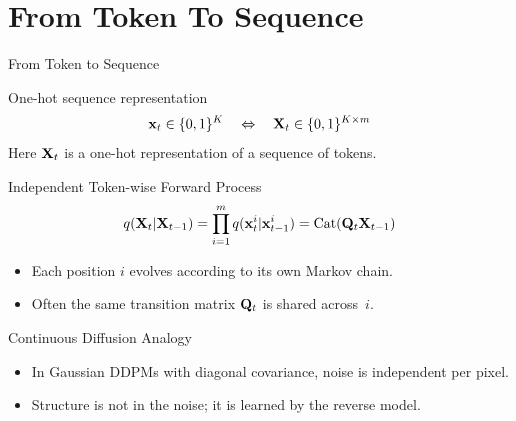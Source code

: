 \documentclass{beamer}
\renewcommand{\eqpause}{}
\begin{document}
\section{From Token To Sequence}
\begin{frame}{From Token to Sequence}
    \begin{block}{One-hot sequence representation}
        \vspace{-0.3cm}
        \[
            \mathbf{x}_t \in \{0,1\}^K
            \quad\Leftrightarrow\quad
            \mathbf{X}_t \in \{0,1\}^{K \times m}
        \]
        \vspace{-0.2cm}
        Here $\mathbf{X}_t$ is a one-hot representation of a sequence of tokens.
    \end{block}
    \eqpause
    \begin{block}{Independent Token-wise Forward Process}
        \vspace{-0.3cm}
        \[
            q(\mathbf{X}_t |\mathbf{X}_{t-1}) =
            \prod_{i=1}^m q(\mathbf{x}_t^i |\mathbf{x}_{t-1}^i) = \operatorname{Cat}(\mathbf{Q}_t \mathbf{X}_{t-1})
        \]
        \vspace{-0.3cm}
        \begin{itemize}
            \item Each position $i$ evolves according to its own Markov chain.
            \item Often the same transition matrix $\mathbf{Q}_t$ is shared across~$i$.
        \end{itemize}
    \end{block}
    \eqpause
    \begin{block}{Continuous Diffusion Analogy}
        \begin{itemize}
            \item In Gaussian DDPMs with diagonal covariance, noise is independent per pixel.
            \item Structure is not in the noise; it is learned by the reverse model.
        \end{itemize}
    \end{block}
\end{frame}
\end{document}
